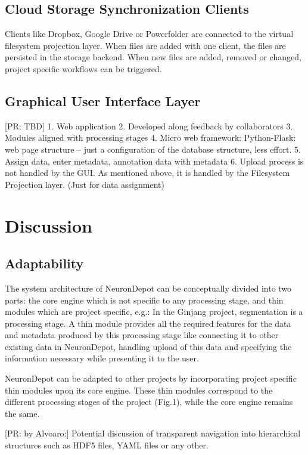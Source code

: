 \documentclass{frontiersSCNS} %
\newcommand{\pr}[1]{[\textcolor{YellowOrange}{PR: #1}]}
\begin{document}
\subsection{Cloud Storage Synchronization Clients}

Clients like Dropbox, Google Drive or Powerfolder are connected to the virtual
filesystem projection layer. When files are added with one client, the files
are persisted in the storage backend. When new files are added, removed or
changed, project specific workflows can be triggered.

\subsection{Graphical User Interface Layer}

\pr{TBD}
1. Web application
2. Developed along feedback by collaborators
3. Modules aligned with processing stages
4. Micro web framework: Python-Flask: web page structure – just a configuration of the database structure, less effort.
5. Assign data, enter metadata, annotation data with metadata
6. Upload process is not handled by the GUI. As mentioned above, it is handled by the Filesystem Projection layer. (Just for data assignment)


\section{Discussion}

\subsection{Adaptability}
The system architecture of NeuronDepot can be conceptually divided into two
parts: the core engine which is not specific to any processing stage, and thin
modules which are project specific, e.g.: In the Ginjang project, segmentation
is a processing stage. A thin module provides all the required features for the
data and metadata produced by this processing stage like connecting it to other
existing data in NeuronDepot, handling upload of this data and specifying the
information necessary while presenting it to the user.

NeuronDepot can be adapted to other projects by incorporating project specific
thin modules upon its core engine. These thin modules correspond to the
different processing stages of the project (Fig.1), while the core engine
remains the same.

\pr{by Alvoaro:} Potential discussion of transparent navigation into hierarchical structures such as HDF5 files, YAML files or any other.
\end{document}
